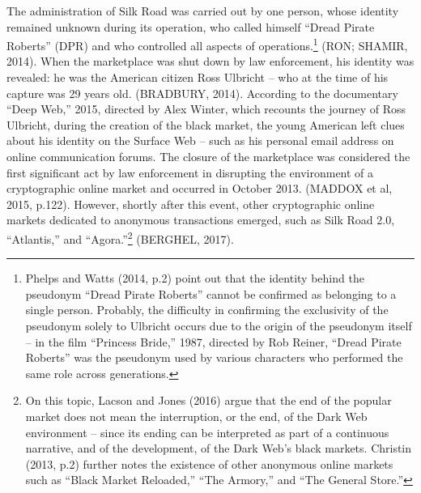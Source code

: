 The administration of Silk Road was carried out by one person, whose identity remained unknown during its operation, who called himself ``Dread Pirate Roberts'' (DPR) and who controlled all aspects of operations.\footnote{Phelps and Watts (2014, p.2) point out that the identity behind the pseudonym ``Dread Pirate Roberts'' cannot be confirmed as belonging to a single person. Probably, the difficulty in confirming the exclusivity of the pseudonym solely to Ulbricht occurs due to the origin of the pseudonym itself -- in the film ``Princess Bride,'' 1987, directed by Rob Reiner, ``Dread Pirate Roberts'' was the pseudonym used by various characters who performed the same role across generations.} (RON; SHAMIR, 2014). When the marketplace was shut down by law enforcement, his identity was revealed: he was the American citizen Ross Ulbricht -- who at the time of his capture was 29 years old. (BRADBURY, 2014). According to the documentary ``Deep Web,'' 2015, directed by Alex Winter, which recounts the journey of Ross Ulbricht, during the creation of the black market, the young American left clues about his identity on the Surface Web -- such as his personal email address on online communication forums. The closure of the marketplace was considered the first significant act by law enforcement in disrupting the environment of a cryptographic online market and occurred in October 2013. (MADDOX et al, 2015, p.122). However, shortly after this event, other cryptographic online markets dedicated to anonymous transactions emerged, such as Silk Road 2.0, ``Atlantis,'' and ``Agora.''\footnote{On this topic, Lacson and Jones (2016) argue that the end of the popular market does not mean the interruption, or the end, of the Dark Web environment -- since its ending can be interpreted as part of a continuous narrative, and of the development, of the Dark Web's black markets. Christin (2013, p.2) further notes the existence of other anonymous online markets such as ``Black Market Reloaded,'' ``The Armory,'' and ``The General Store.''} (BERGHEL, 2017).

